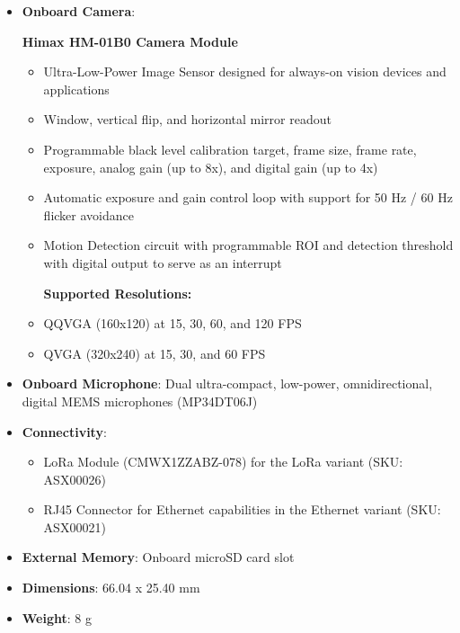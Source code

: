 \begin{itemize}
	\item \textbf{Onboard Camera}:
	
	\textbf{Himax HM-01B0 Camera Module}
	\begin{itemize}
		
		\item Ultra-Low-Power Image Sensor designed for always-on vision devices and applications
		\item Window, vertical flip, and horizontal mirror readout
		\item Programmable black level calibration target, frame size, frame rate, exposure, analog gain (up to 8x), and digital gain (up to 4x)
		\item Automatic exposure and gain control loop with support for 50 Hz / 60 Hz flicker avoidance
		\item Motion Detection circuit with programmable ROI and detection threshold with digital output to serve as an interrupt
		
		\textbf{Supported Resolutions:}
		
		\item QQVGA (160x120) at 15, 30, 60, and 120 FPS 
		\item QVGA (320x240) at 15, 30, and 60 FPS \cite{arduino_datasheet:2025}
	\end{itemize}

	\item \textbf{Onboard Microphone}: Dual ultra-compact, low-power, omnidirectional, digital MEMS microphones (MP34DT06J)
	\item \textbf{Connectivity}:
	\begin{itemize}
		\item LoRa Module (CMWX1ZZABZ-078) for the LoRa variant (SKU: ASX00026)
		\item RJ45 Connector for Ethernet capabilities in the Ethernet variant (SKU: ASX00021)
	\end{itemize}
	\item \textbf{External Memory}: Onboard microSD card slot
	\item \textbf{Dimensions}: 66.04 x 25.40 mm
	\item \textbf{Weight}: 8 g \cite{arduino_datasheet:2025}
\end{itemize}


